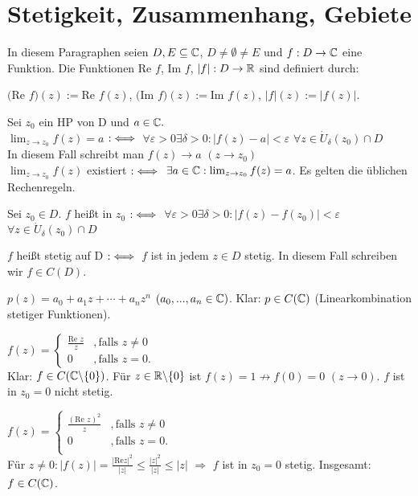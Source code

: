 \documentclass[a4paper,twoside,DIV15,BCOR12mm]{scrbook}
\def\gdw{\equizu}
\def\gdw{\equizu}
\begin{document}
\chapter{Stetigkeit, Zusammenhang, Gebiete}
In diesem Paragraphen seien $D, E \subseteq \mathbb{C}$, $D \neq \emptyset \neq E$ und $f: D \to \mathbb{C}$ eine Funktion.
Die Funktionen  Re $f$, Im $f$, $|f|: D \to \mathbb{R}$ sind definiert durch: \\
\centerline{$($Re $f)(z) := $Re $f(z)$, $($Im $f)(z) := $Im $f(z)$, $|f|(z) := |f(z)|$.}

\begin{definition}
Sei $z_0$ ein HP von D und $a \in \mathbb{C}.$ \\
$\lim_{z \to z_0} f(z) = a $ $:\gdw$ $\forall  \varepsilon > 0 \exists \delta > 0 : |f(z)-a| <  \varepsilon$ $\forall z\in \dot{U}_{ \delta}(z_0) \cap D $\\
In diesem Fall schreibt man $f(z) \to a$ $(z\to z_0)$ \\
$\lim_{z \to z_0} f(z)$ existiert $:\gdw$ $\exists a \in \mathbb{C} : \lim_{z \to z_0} f(z) = a $. Es gelten die üblichen Rechenregeln.
\end{definition}

\begin{definition}
\begin{liste}
\item Sei $z_0 \in D$. $f$ heißt  in $z_0$ $:\gdw$ $\forall  \varepsilon > 0 \exists \delta > 0 : |f(z)-f(z_0)| <  \varepsilon$ $\forall z\in \dot{U}_{ \delta}(z_0) \cap D$
\item $f$ heißt stetig auf D $:\gdw$ $f$ ist in jedem $z \in D$ stetig. In diesem Fall schreiben wir $f \in C(D)$.
\end{liste}
\end{definition}

\begin{beispiel}
\begin{liste}
\item $p(z) = a_0 + a_1z+\cdots+a_nz^n$ $(a_0,...,a_n \in \mathbb{C})$. Klar: $p \in C(\mathbb{C})$ (Linearkombination stetiger Funktionen).
\item  $f(z) =\begin{cases}
		\frac{\text{Re } z}{z} &, \text{falls } z\neq 0 \\
		0 &, \text{falls } z = 0.
		\end{cases}
		$\\
		Klar: $f\in C(\mathbb{C} \backslash \{0\})$. Für $z \in \mathbb{R} \backslash \{0\} $ ist $f(z) = 1 \not\to f(0) = 0$ $(z \to 0)$. $f$ ist in $z_0 = 0$ nicht stetig.
\item $f(z) =\begin{cases}
		\frac{(\text{Re } z)^2}{z} &, \text{falls } z\neq 0 \\
		0 &, \text{falls } z = 0.\\
		\end{cases}
		$\\
      Für $z \neq 0: |f(z)| = \frac{| \text{Re} z |^2}{|z|} \leq \frac{|z|^2}{|z|} \leq |z|$ $\Rightarrow$ $f$ ist in $z_0 = 0$ stetig. Insgesamt: $f \in C(\mathbb{C})$.
\end{liste}
\end{beispiel}
\end{document}
